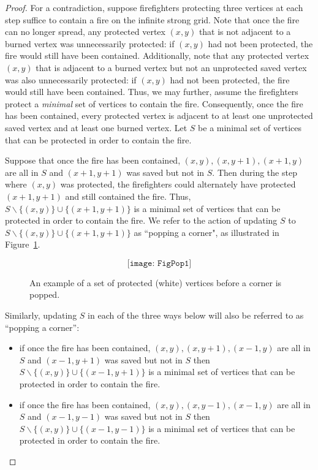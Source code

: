 \documentclass[12pt]{article}
\begin{document}
\begin{proof} For a contradiction, suppose firefighters protecting three vertices at each step suffice to contain a fire on the infinite strong grid.  Note that once the fire can no longer spread, any protected vertex $(x,y)$ that is not adjacent to a burned vertex was unnecessarily protected: if $(x,y)$ had not been protected, the fire would still have been contained.  Additionally, note that any protected vertex $(x,y)$ that is adjacent to a burned vertex but not an unprotected saved vertex was also unnecessarily protected: if $(x,y)$ had not been protected, the fire would still have been contained.  Thus, we may further, assume the firefighters protect a {\it minimal} set of vertices to contain the fire.  Consequently, once the fire has been contained, every protected vertex is adjacent to at least one unprotected saved vertex and at least one burned vertex.  Let $S$ be a minimal set of vertices that can be protected in order to contain the fire.\bigskip

Suppose that once the fire has been contained, $(x,y), (x,y+1),(x+1,y)$ are all in $S$ and $(x+1,y+1)$ was saved but not in $S$.  Then during the step where $(x,y)$ was protected, the firefighters could alternately have protected $(x+1,y+1)$ and still contained the fire.  Thus, $S \backslash \{(x,y)\} \cup \{(x+1,y+1)\}$ is a minimal set of vertices that can be protected in order to contain the fire.  We refer to the action of updating $S$ to $S \backslash \{(x,y)\} \cup \{(x+1,y+1)\}$ as ``popping a corner", as illustrated in Figure~\ref{fig:pop}.  

\begin{figure}[htbp]
\[ \texttt{[image: FigPop1]}\]
\caption{An example of a set of protected (white) vertices before a corner is popped.} 

\label{fig:pop} 
\end{figure}

Similarly, updating $S$ in each of the three ways below will also be referred to as ``popping a corner'': \begin{itemize} 

\item if once the fire has been contained, $(x,y),(x,y+1),(x-1,y)$ are all in $S$ and $(x-1,y+1)$ was saved but not in $S$ then $S \backslash \{(x,y)\} \cup \{(x-1,y+1)\}$ is a minimal set of vertices that can be protected in order to contain the fire.  

\item if once the fire has been contained, $(x,y),(x,y-1),(x-1,y)$ are all in $S$ and $(x-1,y-1)$ was saved but not in $S$ then $S \backslash \{(x,y)\} \cup \{(x-1,y-1)\}$ is a minimal set of vertices that can be protected in order to contain the fire.  


\end{itemize}
\end{proof}
\end{document}
